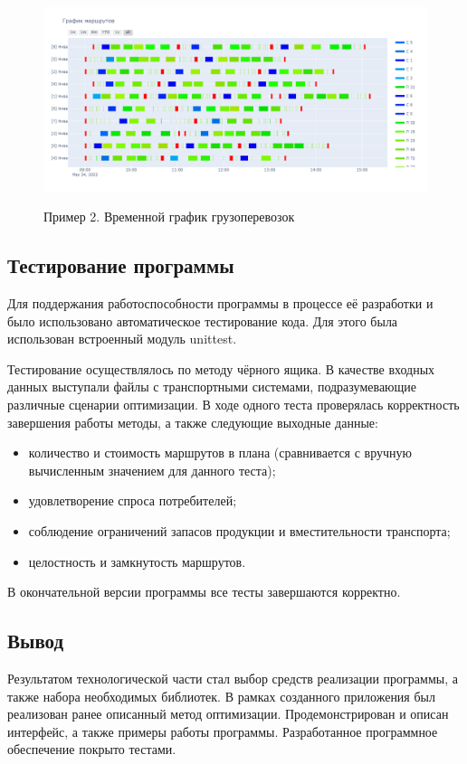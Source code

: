 \begin{figure}[h!]
	\begin{center}
		{\includegraphics[scale=0.4, angle=0, page=1]{img/demo_schedule_2.png}}
		\caption{Пример 2. Временной график грузоперевозок}
		\label{demo:schedule2}
	\end{center}
\end{figure}

\newpage
\subsection{Тестирование программы}
Для поддержания работоспособности программы в процессе её разработки и было использовано автоматическое тестирование кода. Для этого была использован встроенный модуль unittest\cite{libs:unittest}. 

\pagebreak
Тестирование осуществлялось по методу чёрного ящика. В качестве входных данных выступали файлы с транспортными системами, подразумевающие различные сценарии оптимизации. В ходе одного теста проверялась корректность завершения работы методы, а также следующие выходные данные:

\begin{itemize}
	\item количество и стоимость маршрутов в плана (сравнивается с вручную вычисленным значением для данного теста);
	\item удовлетворение спроса потребителей;
	\item соблюдение ограничений запасов продукции и вместительности транспорта;
	\item целостность и замкнутость маршрутов.
\end{itemize}

В окончательной версии программы все тесты завершаются корректно.

\subsection*{Вывод}
Результатом технологической части стал выбор средств реализации программы, а также набора необходимых библиотек. В рамках созданного приложения был реализован ранее описанный метод оптимизации. Продемонстрирован и описан интерфейс, а также примеры работы программы. Разработанное программное обеспечение покрыто тестами.


\pagebreak